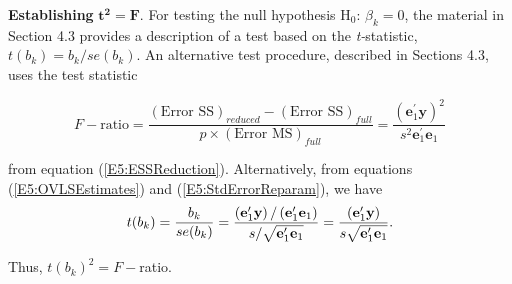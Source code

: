 \textbf{Establishing }$\mathbf{t}^{\mathbf{2}}\mathbf{=F}$. For testing the
null hypothesis H$_{0}$: $\beta _{k}=0$, the material in Section 4.3
provides a description of a test based on the \textit{t-}statistic, $%
t(b_{k})=b_{k}/se(b_{k})$. An alternative test procedure, described
in Sections 4.3, uses the test statistic
\begin{center}
\[
F-\text{ratio}=\frac{(\text{Error SS})_{reduced}-(\text{Error SS}%
)_{full}}{p \times (\text{Error MS})_{full}}=\frac{\left( \mathbf{e}%
_{1}^{\prime }\mathbf{y}\right) ^{2}}{s^{2}\mathbf{e}_{1}^{\prime }%
\mathbf{e}_{1}}
\]%
\end{center}
from equation (\ref{E5:ESSReduction}). Alternatively, from equations
(\ref{E5:OVLSEstimates}) and (\ref{E5:StdErrorReparam}), we have
\begin{equation}\label{E5:tStat}
t(b_{k})=\frac{b_{k}}{se(b_{k})}=\frac{\left( \mathbf{e}_{1}^{\prime }%
\mathbf{y}\right) /\left( \mathbf{e}_{1}^{\prime }\mathbf{e}%
_{1}\right) }{s/\sqrt{\mathbf{e}_{1}^{\prime }\mathbf{e}_{1}}}=%
\frac{\left( \mathbf{e}_{1}^{\prime }\mathbf{y}\right) }{s\sqrt{%
\mathbf{e}_{1}^{\prime }\mathbf{e}_{1}}}.
\end{equation}

\noindent Thus, $t(b_{k})^{2}=F-$ratio.

